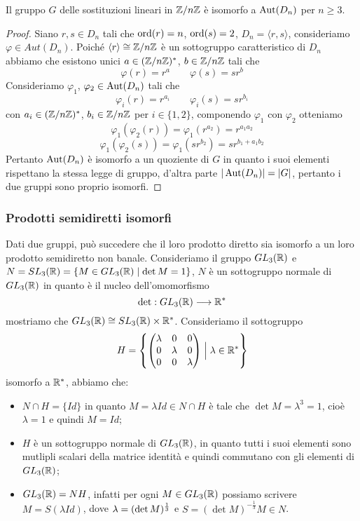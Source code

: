 \documentclass[11pt]{scrartcl}
\begin{document}
\begin{proposition}
    Il gruppo $G$ delle sostituzioni lineari in ${\mathbb Z}/n{\mathbb Z}$ è isomorfo a $\operatorname{Aut}(D_n)$
    per $n \geq 3$.
\end{proposition}

\begin{proof}
    Siano $r, s \in D_n$ tali che $\operatorname{ord}(r) = n$, $\operatorname{ord}(s) = 2$, $D_n = \langle r, s\rangle$,
    consideriamo $\varphi \in Aut(D_n)$. Poiché $\langle r\rangle \cong {\mathbb Z}/n{\mathbb Z}$ è un 
    sottogruppo caratteristico di $D_n$ abbiamo che esistono unici $a \in ({\mathbb Z}/n{\mathbb Z})^*$,
    $b \in {\mathbb Z}/n{\mathbb Z}$ tali che 
    \[
        \varphi(r) = r^a\qquad \varphi(s) = sr^b
    \]
    Consideriamo $\varphi_1$, $\varphi_2 \in \operatorname{Aut}(D_n)$ tali che
    \[
        \varphi_i(r) = r^{a_i} \qquad \varphi_i(s) = sr^{b_i}
    \]
    con $a_i \in ({\mathbb Z}/n{\mathbb Z})^*$, $b_i \in {\mathbb Z}/n{\mathbb Z}$ per $i \in \{1, 2\}$, componendo
    $\varphi_1$ con $\varphi_2$ otteniamo
    \[
        \varphi_1(\varphi_2(r)) = \varphi_1(r^{a_2}) = r^{a_1a_2}
    \]
    \[
        \varphi_1(\varphi_2(s)) = \varphi_1(sr^{b_2}) = sr^{b_1 + a_1b_2}
    \]
    Pertanto $\operatorname{Aut}(D_n)$ è isomorfo a un quoziente di $G$ in quanto i suoi
    elementi rispettano la stessa legge di gruppo, d'altra parte $|\operatorname{Aut}(D_n)| = |G|$,
    pertanto i due gruppi sono proprio isomorfi.
\end{proof}

\subsubsection{Prodotti semidiretti isomorfi}

Dati due gruppi, può succedere che il loro prodotto diretto sia isomorfo a 
un loro prodotto semidiretto non banale.\newline
Consideriamo il gruppo $GL_3(\mathbb R)$ e $N = SL_3(\mathbb R) = \{M \in GL_3(\mathbb R)
\mid \det M = 1\}$, $N$ è un sottogruppo normale di $GL_3(\mathbb R)$ in quanto è il nucleo
dell'omomorfismo
\[
    \det: GL_3(\mathbb R) \longrightarrow \mathbb R^*
\]
mostriamo che $GL_3(\mathbb R) \cong SL_3(\mathbb R)\times\mathbb R^*$. Consideriamo il sottogruppo
\[
    H = \left\{\begin{pmatrix}
    \lambda & 0 & 0\\
    0 & \lambda & 0\\
    0 & 0 & \lambda
    \end{pmatrix}\Bigm| \lambda \in \mathbb R^* \right\}
\]isomorfo a $\mathbb R^*$, abbiamo che:

\begin{itemize}
    \item $N \cap H = \{Id\}$ in quanto $M = \lambda Id \in N\cap H$ è tale
    che $\det M = \lambda^3 = 1$, cioè $\lambda = 1$ e quindi $M = Id$;
    \item $H$ è un sottogruppo normale di $GL_3(\mathbb R)$, in quanto tutti i suoi elementi
    sono mutlipli scalari della matrice identità e quindi commutano con gli
    elementi di $GL_3(\mathbb R)$;
    \item $GL_3(\mathbb R) = NH$, infatti per ogni $M \in GL_3(\mathbb R)$ possiamo scrivere $M = S(\lambda Id)$,
    dove $\lambda = \nolinebreak(\det M)^{\frac 1 3}$ e $S = (\det M)^{-\frac 1 3} M \in N$.
\end{itemize}
\end{document}
